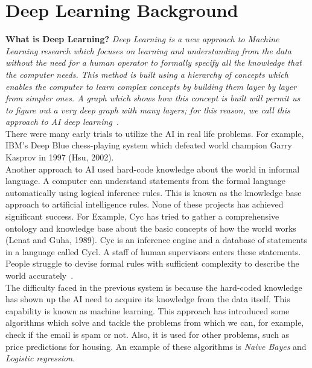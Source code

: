 \clearpage
\section{Deep Learning Background}\label{Sec:Deep_Learning_Background}


\textbf{What is Deep Learning?} \textit{ Deep Learning is a new approach to Machine Learning research which focuses on learning and understanding from the data without the need for a human operator to formally specify all the knowledge that the computer needs. This method is built using a hierarchy of concepts which enables the computer to learn complex concepts by building them layer by layer from simpler ones. A graph which shows how this concept is built will permit us to figure out a very deep graph with many layers; for this reason, we call this approach to AI deep learning~\cite{Goodfellow-et-al-2016}}.\\

There were many early trials to utilize the AI in real life problems. For example, IBM's Deep Blue chess-playing system which defeated world champion Garry Kasprov in 1997 (Hsu, 2002).\\ %

Another approach to AI used hard-code knowledge about the world in informal language. A computer can understand statements from the formal language automatically using logical inference rules. This is known as the knowledge base approach to artificial intelligence rules. None of these projects has achieved significant success. For Example, Cyc has tried to gather a comprehensive ontology and knowledge base about the basic concepts of how the world works (Lenat and Guha, 1989).%
Cyc is an inference engine and a database of statements in a language called Cycl. A staff of human supervisors enters these statements. People struggle to devise formal rules with sufficient complexity to describe the world accurately~\cite{Goodfellow-et-al-2016}.\\

The difficulty faced in the previous system is because the hard-coded knowledge has shown up the AI need to acquire its knowledge from the data itself. This capability is known as machine learning. This approach has introduced some algorithms which solve and tackle the problems from which we can, for example, check if the email is spam or not. Also, it is used for other problems, such as price predictions for housing. An example of these algorithms is \textit{Naive Bayes} and \textit{Logistic regression}.

